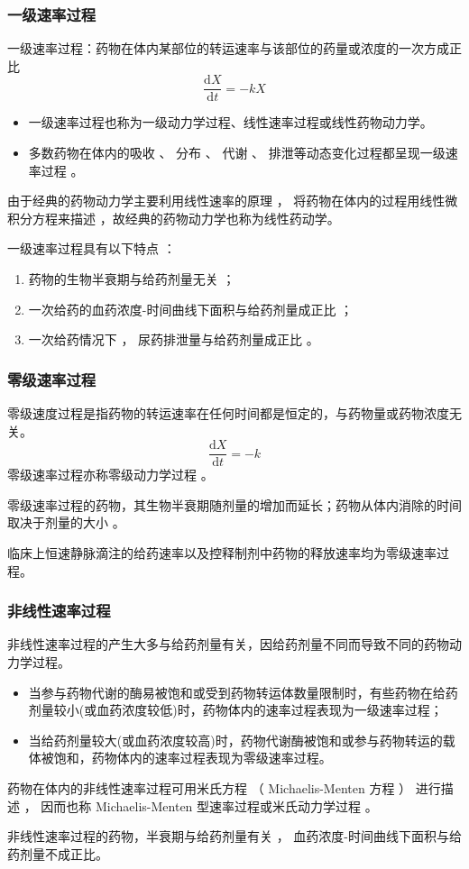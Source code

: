 \documentclass[dvipsnames, svgnames, x11names]{beamer}
\begin{document}
\begin{frame}
	\frametitle{一级速率过程}
	一级速率过程：药物在体内某部位的转运速率与该部位的药量或浓度的一次方成正比
	\[
		\frac{\mathrm{d}X}{\mathrm{d}t}=-kX
	\]
    \begin{itemize}
      \item 一级速率过程也称为一级动力学过程、线性速率过程或线性药物动力学。
      \item 多数药物在体内的吸收 、 分布 、 代谢 、 排泄等动态变化过程都呈现一级速率过程 。
    \end{itemize}
	
	
	由于经典的药物动力学主要利用线性速率的原理 ， 将药物在体内的过程用线性微积分方程来描述 ，故经典的药物动力学也称为线性药动学。

	一级速率过程具有以下特点 ：
	\begin{enumerate}
	  \item 药物的生物半衰期与给药剂量无关 ；
	  \item 一次给药的血药浓度-时间曲线下面积与给药剂量成正比 ；
	  \item 一次给药情况下 ， 尿药排泄量与给药剂量成正比 。
	\end{enumerate}
\end{frame}


\begin{frame}
	\frametitle{零级速率过程}
	零级速度过程是指药物的转运速率在任何时间都是恒定的，与药物量或药物浓度无关。
	\[
		\frac{\mathrm{d}X}{\mathrm{d}t}=-k
	\]
	零级速率过程亦称零级动力学过程 。
	
	零级速率过程的药物，其生物半衰期随剂量的增加而延长；药物从体内消除的时间取决于剂量的大小 。
	\begin{blankblock}{}
		临床上恒速静脉滴注的给药速率以及控释制剂中药物的释放速率均为零级速率过程。
	\end{blankblock}
\end{frame}


\begin{frame}
	\frametitle{非线性速率过程}
	非线性速率过程的产生大多与给药剂量有关，因给药剂量不同而导致不同的药物动力学过程。
	\begin{itemize}
	  \item 当参与药物代谢的酶易被饱和或受到药物转运体数量限制时，有些药物在给药剂量较小(或血药浓度较低)时，药物体内的速率过程表现为一级速率过程；
	  \item 当给药剂量较大(或血药浓度较高)时，药物代谢酶被饱和或参与药物转运的载体被饱和，药物体内的速率过程表现为零级速率过程。
	\end{itemize}
	药物在体内的非线性速率过程可用米氏方程 （ Michaelis-Menten 方程 ） 进行描述 ， 因而也称 Michaelis-Menten 型速率过程或米氏动力学过程 。

	非线性速率过程的药物，半衰期与给药剂量有关 ， 血药浓度-时间曲线下面积与给药剂量不成正比。 
\end{frame}
\end{document}
